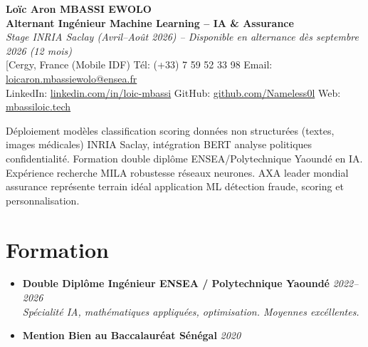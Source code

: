 \documentclass[a4paper,11pt]{article}
\begin{document}
\begin{center}
    {\Large \textbf{Lo\"ic Aron MBASSI EWOLO}} \\ \vspace{4pt}
    \textbf{\large Alternant Ing\'enieur Machine Learning -- IA \& Assurance} \\
    \textit{\small Stage INRIA Saclay (Avril--Ao\^ut 2026) -- Disponible en alternance d\`es septembre 2026 (12 mois)} \\ \vspace{4pt}
    \small
    [Cergy, France (Mobile IDF) \quad
    Tél: (+33) 7 59 52 33 98 \quad
    {\color{primary}Email: \href{mailto:loicaron.mbassiewolo@ensea.fr}{loicaron.mbassiewolo@ensea.fr}} \\ \vspace{2pt}
    {\color{primary}LinkedIn: \href{https://www.linkedin.com/in/loic-mbassi/}{linkedin.com/in/loic-mbassi}} \quad
    {\color{primary}GitHub: \href{https://github.com/Nameless0l}{github.com/Nameless0l}} \quad
    {\color{primary}Web: \href{https://mbassiloic.tech}{mbassiloic.tech}}
\end{center}
\vspace{-6pt}
\noindent\small{D\'eploiement mod\`eles classification scoring donn\'ees non structur\'ees (textes, images m\'edicales) INRIA Saclay, int\'egration BERT analyse politiques confidentialit\'e. Formation double dipl\^ome ENSEA/Polytechnique Yaound\'e en IA. Exp\'erience recherche MILA robustesse r\'eseaux neurones. AXA leader mondial assurance repr\'esente terrain id\'eal application ML d\'etection fraude, scoring et personnalisation.}

\section{Formation}
\begin{itemize}[leftmargin=0.5cm, nosep]
    \item \textbf{Double Dipl\^ome Ing\'enieur ENSEA / Polytechnique Yaound\'e} \hfill \textit{2022--2026} \\
    \textit{Sp\'ecialit\'e IA, math\'ematiques appliqu\'ees, optimisation. Moyennes exc\'ellentes.}
    \item \textbf{Mention Bien au Baccalaur\'eat S\'en\'egal} \hfill \textit{2020}
\end{itemize}
\end{document}

